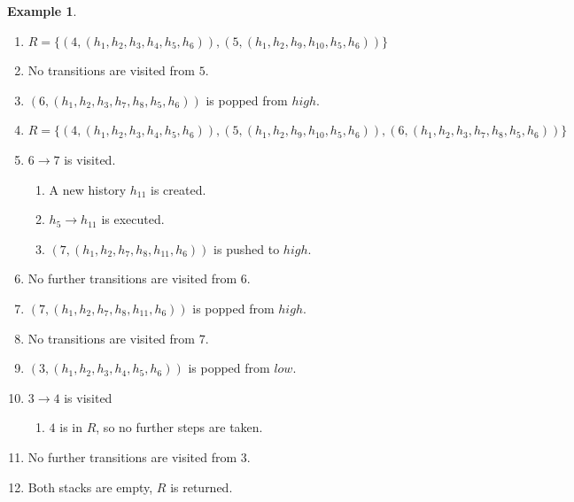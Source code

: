 \documentclass[english]{sigplanconf}
\theoremstyle{definition}
\newtheorem{example}{Example}[section]
\begin{document}
\begin{example}
\begin{enumerate}
\item $R=\{(4, (h_1, h_2, h_3, h_4, h_5, h_6)),\allowbreak (5, (h_1, h_2, h_9, h_{10}, h_5, h_6))\}$
\item No transitions are visited from $5$.
\item $(6, (h_1, h_2, h_3, h_7, h_8, h_5, h_6))$ is popped from $high$.
\item $R=\{(4, (h_1, h_2, h_3, h_4, h_5, h_6)),\allowbreak (5, (h_1, h_2, h_9, h_{10}, h_5, h_6)),\allowbreak (6, (h_1, h_2, h_3, h_7, h_8, h_5, h_6))\}$
\item $6\rightarrow 7$ is visited.\begin{enumerate}
	\item A new history $h_{11}$ is created.
	\item $h_5\rightarrow h_{11}$ is executed.
	\item $(7, (h_1, h_2, h_7, h_8, h_{11}, h_6))$ is pushed to $high$.
\end{enumerate}
\item No further transitions are visited from $6$.
\item $(7, (h_1, h_2, h_7, h_8, h_{11}, h_6))$ is popped from $high$.
\item No transitions are visited from $7$.
\item $(3, (h_1, h_2, h_3, h_4, h_5, h_6))$ is popped from $low$.
\item $3\rightarrow 4$ is visited \begin{enumerate}
	\item $4$ is in $R$, so no further steps are taken.
\end{enumerate}
\item No further transitions are visited from $3$.
\item Both stacks are empty, $R$ is returned.
\end{enumerate}
\label{ex:oneStep2}
\end{example}
\end{document}
